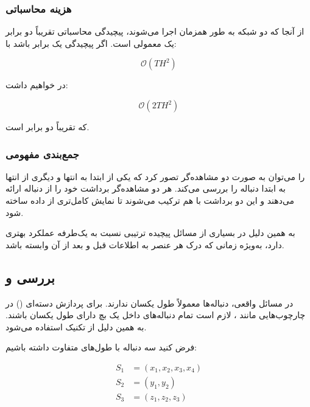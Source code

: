 \documentclass{article}
\begin{document}
\subsubsection{هزینه محاسباتی}

از آنجا که دو شبکه  به طور همزمان اجرا می‌شوند، پیچیدگی محاسباتی تقریباً دو برابر یک  معمولی است. 
اگر پیچیدگی یک  برابر باشد با:

\begin{equation}
	\mathcal{O}(T H^2)
\end{equation}

در  خواهیم داشت:

\begin{equation}
	\mathcal{O}(2 T H^2)
\end{equation}

که تقریباً دو برابر است.

\subsubsection{جمع‌بندی مفهومی}

 را می‌توان به صورت دو مشاهده‌گر تصور کرد که یکی از ابتدا به انتها و دیگری از انتها به ابتدا دنباله را بررسی می‌کند. 
هر دو مشاهده‌گر برداشت خود را از دنباله ارائه می‌دهند و این دو برداشت با هم ترکیب می‌شوند تا نمایش کامل‌تری از داده ساخته شود.

به همین دلیل  در بسیاری از مسائل پیچیده ترتیبی نسبت به  یک‌طرفه عملکرد بهتری دارد، به‌ویژه زمانی که درک هر عنصر به اطلاعات قبل و بعد از آن وابسته باشد.


\subsection{بررسی  و }

در مسائل واقعی، دنباله‌ها معمولاً طول یکسان ندارند. 
برای پردازش دسته‌ای () در چارچوب‌هایی مانند ، لازم است تمام دنباله‌های داخل یک بچ دارای طول یکسان باشند. 
به همین دلیل از تکنیک  استفاده می‌شود.

فرض کنید سه دنباله با طول‌های متفاوت داشته باشیم:

\begin{align}
	S_1 &= (x_1, x_2, x_3, x_4) \\
	S_2 &= (y_1, y_2) \\
	S_3 &= (z_1, z_2, z_3)
\end{align}
\end{document}
